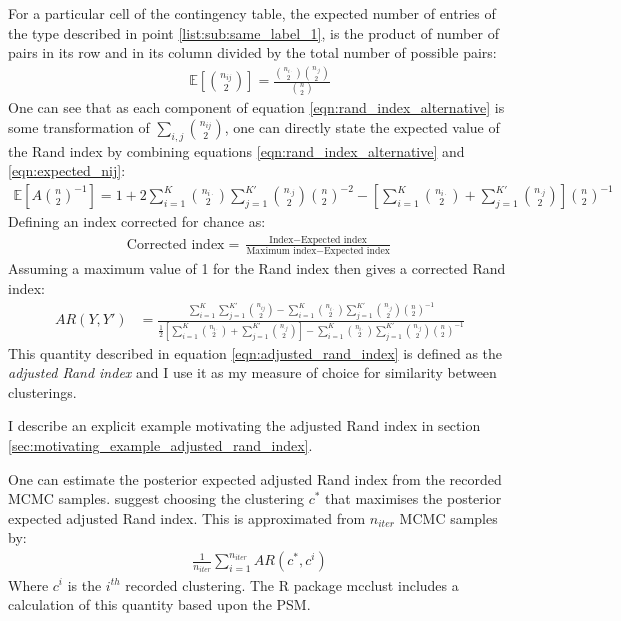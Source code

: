 \documentclass[12pt]{article} %
\begin{document}
	For a particular cell of the contingency table, the expected number of entries of the type described in point \ref{list:sub:same_label_1}, is the product of number of pairs in its row and in its column divided by the total number of possible pairs:
	\begin{eqnarray} \label{eqn:expected_nij}
	\mathbb{E}\left[\binom{n_{ij}}{2}\right] = \frac{\binom{n_{i\cdot}}{2}\binom{n_{\cdot j}}{2}}{\binom{n}{2}}
	\end{eqnarray}
	One can see that as each component of equation \ref{eqn:rand_index_alternative} is some transformation of $\sum_{i,j}\binom{n_{ij}}{2}$, one can directly state the expected value of the Rand index by combining equations \ref{eqn:rand_index_alternative} and \ref{eqn:expected_nij}:
	\begin{eqnarray}
	\mathbb{E}\left[A \binom{n}{2}^{-1}\right] = 1 + 2 \sum_{i=1}^{K} \binom{n_{i \cdot}}{2} \sum_{j=1}^{K'} \binom{n_{\cdot j}}{2} \binom{n}{2}^{-2} - \left[\sum_{i=1}^{K} \binom{n_{i \cdot}}{2} + \sum_{j=1}^{K'} \binom{n_{\cdot j}}{2}\right] \binom{n}{2}^{-1}
	\end{eqnarray}
	Defining an index corrected for chance as:
	\begin{eqnarray}
	\text{Corrected index} = \frac{\text{Index} - \text{Expected index}}{\text{Maximum index} - \text{Expected index}}
	\end{eqnarray}
	Assuming a maximum value of 1 for the Rand index then gives a corrected Rand index:
	\begin{eqnarray} \label{eqn:adjusted_rand_index}
	AR(Y, Y') &= \frac{\sum_{i=1}^{K}\sum_{j=1}^{K'} \binom{n_{ij}}{2} - \sum_{i=1}^{K} \binom{n_{i \cdot}}{2} \sum_{j=1}^{K'} \binom{n_{\cdot j}}{2} \binom{n}{2}^{-1}}{\frac{1}{2} \left[\sum_{i=1}^{K} \binom{n_{i \cdot}}{2} + \sum_{j=1}^{K'} \binom{n_{\cdot j}}{2}\right] - \sum_{i=1}^{K} \binom{n_{i \cdot}}{2} \sum_{j=1}^{K'} \binom{n_{\cdot j}}{2} \binom{n}{2}^{-1}}
	\end{eqnarray}
	This quantity described in equation \ref{eqn:adjusted_rand_index} is defined as the \emph{adjusted Rand index} and I use it as my measure of choice for similarity between clusterings.
	
	I describe an explicit example motivating the adjusted Rand index in section \ref{sec:motivating_example_adjusted_rand_index}.
	
	One can estimate the posterior expected adjusted Rand index from the recorded MCMC samples. \citet{FritschImprovedcriteriaclustering2009} suggest choosing the clustering $c^*$ that maximises the posterior expected adjusted Rand index. This is approximated from $n_{iter}$ MCMC samples by:
	\begin{align} \label{eqn:PEAR}
	\frac{1}{n_{iter}}\sum_{i=1}^{n_{iter}} AR(c^*, c^i)
	\end{align}
	Where $c^i$ is the $i^{th}$ recorded clustering. The R package mcclust \citep{FritschMcclust2012} includes a calculation of this quantity based upon the PSM.
	
\end{document}
